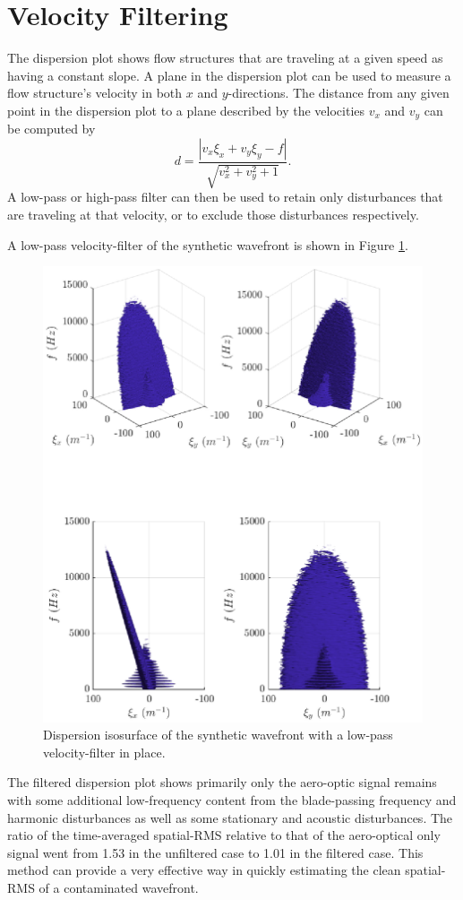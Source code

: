 \section{Velocity Filtering}
The dispersion plot shows flow structures that are traveling at a given speed as having a constant slope.
A plane in the dispersion plot can be used to measure a flow structure's velocity in both $x$ and $y$-directions.
The distance from any given point in the dispersion plot to a plane described by the velocities $v_x$ and $v_y$ can be computed by
\begin{equation}
 d = \frac{|v_x\xi_x+v_y\xi_y-f|}{\sqrt{v_x^2+v_y^2+1}} \textrm{.}
 \label{eqn:06_dist_point_2_plane}
\end{equation}
A low-pass or high-pass filter can then be used to retain only disturbances that are traveling at that velocity, or to exclude those disturbances respectively.

A low-pass velocity-filter of the synthetic wavefront is shown in Figure \ref{fig:06_filter_velocity}.
\begin{figure}
 \centering
 \includegraphics{../matlab/06_single_sensor_filtering/filter_velocity.eps}
 \caption{Dispersion isosurface of the synthetic wavefront with a low-pass velocity-filter in place.}
 \label{fig:06_filter_velocity}
\end{figure}
The filtered dispersion plot shows primarily only the aero-optic signal remains with some additional low-frequency content from the blade-passing frequency and harmonic disturbances as well as some stationary and acoustic disturbances.
The ratio of the time-averaged spatial-RMS relative to that of the aero-optical only signal went from 1.53 in the unfiltered case to 1.01 in the filtered case.
This method can provide a very effective way in quickly estimating the clean spatial-RMS of a contaminated wavefront.

